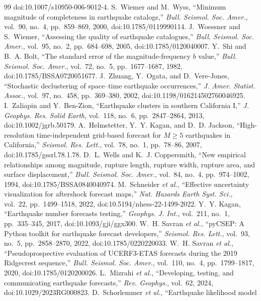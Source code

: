 \documentclass[journal]{IEEEtran}
\begin{document}
\begin{thebibliography}{99}
doi:10.1007/s10950-006-9012-4.
 S.~Wiemer and M.~Wyss, ``Minimum magnitude of completeness in earthquake
catalogs,'' \emph{Bull. Seismol. Soc. Amer.}, vol.~90, no.~4, pp.~859--869, 2000,
doi:10.1785/0119990114.
 J.~Woessner and S.~Wiemer, ``Assessing the quality of earthquake
catalogues,'' \emph{Bull. Seismol. Soc. Amer.}, vol.~95, no.~2, pp.~684--698, 2005,
doi:10.1785/0120040007.
 Y.~Shi and B.~A. Bolt, ``The standard error of the magnitude-frequency
$b$ value,'' \emph{Bull. Seismol. Soc. Amer.}, vol.~72, no.~5, pp.~1677--1687, 1982,
doi:10.1785/BSSA0720051677.
 J.~Zhuang, Y.~Ogata, and D.~Vere-Jones, ``Stochastic declustering of
space--time earthquake occurrences,'' \emph{J. Amer. Statist. Assoc.}, vol.~97, no.~458,
pp.~369--380, 2002, doi:10.1198/016214502760046925.
 I.~Zaliapin and Y.~Ben-Zion, ``Earthquake clusters in southern
California I,'' \emph{J. Geophys. Res. Solid Earth}, vol.~118, no.~6, pp.~2847--2864, 2013,
doi:10.1002/jgrb.50179.
 A.~Helmstetter, Y.~Y. Kagan, and D.~D. Jackson, ``High-resolution
time-independent grid-based forecast for $M\ge5$ earthquakes in California,'' \emph{Seismol.
Res. Lett.}, vol.~78, no.~1, pp.~78--86, 2007, doi:10.1785/gssrl.78.1.78.
 D.~L. Wells and K.~J. Coppersmith, ``New empirical relationships among
magnitude, rupture length, rupture width, rupture area, and surface displacement,''
\emph{Bull. Seismol. Soc. Amer.}, vol.~84, no.~4, pp.~974--1002, 1994,
doi:10.1785/BSSA0840040974.
 M.~Schneider \emph{et al.}, ``Effective uncertainty visualization for
aftershock forecast maps,'' \emph{Nat. Hazards Earth Syst. Sci.}, vol.~22, pp.~1499--1518,
2022, doi:10.5194/nhess-22-1499-2022.
 Y.~Y. Kagan, ``Earthquake number forecasts testing,'' \emph{Geophys. J.
Int.}, vol.~211, no.~1, pp.~335--345, 2017, doi:10.1093/gji/ggx300.
 W.~H. Savran \emph{et al.}, ``pyCSEP: A Python toolkit for earthquake
forecast developers,'' \emph{Seismol. Res. Lett.}, vol.~93, no.~5, pp.~2858--2870, 2022,
doi:10.1785/0220220033.
 W.~H. Savran \emph{et al.}, ``Pseudoprospective evaluation of UCERF3-ETAS
forecasts during the 2019 Ridgecrest sequence,'' \emph{Bull. Seismol. Soc. Amer.}, vol.~110,
no.~4, pp.~1799--1817, 2020, doi:10.1785/0120200026.
 L.~Mizrahi \emph{et al.}, ``Developing, testing, and communicating
earthquake forecasts,'' \emph{Rev. Geophys.}, vol.~62, 2024, doi:10.1029/2023RG000823.
 D.~Schorlemmer \emph{et al.}, ``Earthquake likelihood model

\end{thebibliography}
\end{document}
